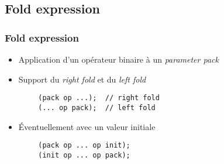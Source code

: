 \documentclass[C++.tex]{subfiles}
\begin{document}
\subsection*{Fold expression}
\begin{frame}[fragile]
	\frametitle{Fold expression}
	\begin{itemize}
		\item Application d'un opérateur binaire à un \textit{parameter pack}
		\item Support du \textit{right fold} et du \textit{left fold}
	\end{itemize}

	\begin{verbatim}
		(pack op ...);  // right fold
		(... op pack);  // left fold
	\end{verbatim}

	\begin{itemize}
		\item Éventuellement avec un valeur initiale
	\end{itemize}

	\begin{verbatim}
		(pack op ... op init);
		(init op ... op pack);
	\end{verbatim}

\end{frame}
\end{document}
